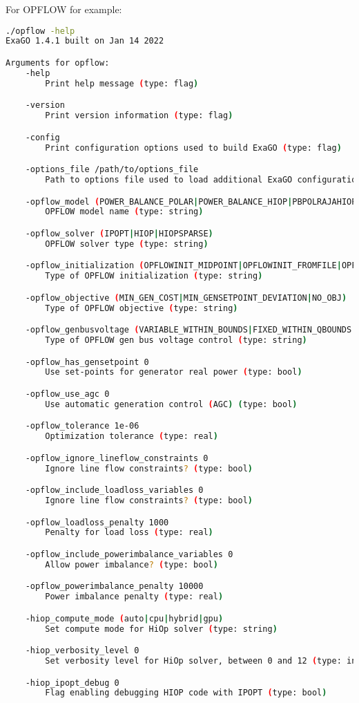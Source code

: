 For OPFLOW for example:
\begin{lstlisting}[language=bash]
./opflow -help
ExaGO 1.4.1 built on Jan 14 2022

Arguments for opflow:
	-help
		Print help message (type: flag)

	-version
		Print version information (type: flag)

	-config
		Print configuration options used to build ExaGO (type: flag)

	-options_file /path/to/options_file
		Path to options file used to load additional ExaGO configuration options (type: string)

	-opflow_model (POWER_BALANCE_POLAR|POWER_BALANCE_HIOP|PBPOLRAJAHIOP)
		OPFLOW model name (type: string)

	-opflow_solver (IPOPT|HIOP|HIOPSPARSE)
		OPFLOW solver type (type: string)

	-opflow_initialization (OPFLOWINIT_MIDPOINT|OPFLOWINIT_FROMFILE|OPFLOWINIT_ACPF|OPFLOWINIT_FLATSTART)
		Type of OPFLOW initialization (type: string)

	-opflow_objective (MIN_GEN_COST|MIN_GENSETPOINT_DEVIATION|NO_OBJ)
		Type of OPFLOW objective (type: string)

	-opflow_genbusvoltage (VARIABLE_WITHIN_BOUNDS|FIXED_WITHIN_QBOUNDS|FIXED_AT_SETPOINT)
		Type of OPFLOW gen bus voltage control (type: string)

	-opflow_has_gensetpoint 0
		Use set-points for generator real power (type: bool)

	-opflow_use_agc 0
		Use automatic generation control (AGC) (type: bool)

	-opflow_tolerance 1e-06
		Optimization tolerance (type: real)

	-opflow_ignore_lineflow_constraints 0
		Ignore line flow constraints? (type: bool)

	-opflow_include_loadloss_variables 0
		Ignore line flow constraints? (type: bool)

	-opflow_loadloss_penalty 1000
		Penalty for load loss (type: real)

	-opflow_include_powerimbalance_variables 0
		Allow power imbalance? (type: bool)

	-opflow_powerimbalance_penalty 10000
		Power imbalance penalty (type: real)

	-hiop_compute_mode (auto|cpu|hybrid|gpu)
		Set compute mode for HiOp solver (type: string)

	-hiop_verbosity_level 0
		Set verbosity level for HiOp solver, between 0 and 12 (type: int)

	-hiop_ipopt_debug 0
		Flag enabling debugging HIOP code with IPOPT (type: bool)
\end{lstlisting}

